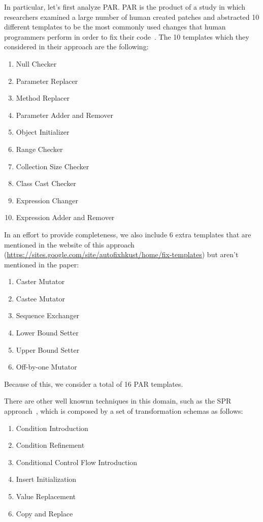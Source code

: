\documentclass[conference]{IEEEtran}
\begin{document}
In particular, let's first analyze PAR. PAR is the product of a study in which researchers examined a large number of human 
created patches and abstracted 10 different templates to be the most 
commonly used changes that human programmers perform in order to fix their code~\cite{kim2013}.
The 10 templates which they considered in their approach are the following:
\begin{enumerate}
 \item Null Checker
 \item Parameter Replacer
 \item Method Replacer
 \item Parameter Adder and Remover
 \item Object Initializer
 \item Range Checker
 \item Collection Size Checker
 \item Class Cast Checker
 \item Expression Changer
 \item Expression Adder and Remover
\end{enumerate}

In an effort to provide completeness, we also include 6 extra templates that are mentioned in the website of this approach (\url{https://sites.google.com/site/autofixhkust/home/fix-templates}) but aren't mentioned in the paper\cite{kim2013}: 

\begin{enumerate}
\item Caster Mutator
\item Castee Mutator
\item Sequence Exchanger
\item Lower Bound Setter
\item Upper Bound Setter
\item Off-by-one Mutator
\end{enumerate}

Because of this, we consider a total of 16 PAR templates.

There are other well knownn techniques in this domain, such as the SPR approach~\cite{fan15}, which is composed by a set of transformation schemas as follows:
\begin{enumerate}
\item Condition Introduction
\item Condition Refinement
\item Conditional Control Flow Introduction
\item Insert Initialization
\item Value Replacement
\item Copy and Replace
\end{enumerate}
\end{document}
